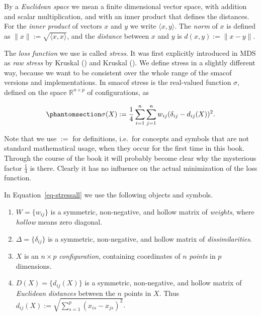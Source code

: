 \documentclass[
  12pt,
  letterpaper,
  DIV=11,
  numbers=noendperiod]{scrreprt}
\providecommand{\tightlist}{%
  \setlength{\itemsep}{0pt}\setlength{\parskip}{0pt}}\usepackage{longtable,booktabs,array}
\theoremstyle{remark}
\begin{document}
By a \emph{Euclidean space} we mean a finite dimensional vector space,
with addition and scalar multiplication, and with an inner product that
defines the distances. For the \emph{inner product} of vectors \(x\) and
\(y\) we write \(\langle x,y\rangle\). The \emph{norm} of \(x\) is
defined as \(\|x\|:=\sqrt{\langle x,x\rangle}\), and the \emph{distance}
between \(x\) and \(y\) is \(d(x,y):=\|x-y\|\).

The \emph{loss function} we use is called \emph{stress}. It was first
explicitly introduced in MDS as \emph{raw stress} by Kruskal
() and Kruskal
(). We define stress in a slightly
different way, because we want to be consistent over the whole range of
the smacof versions and implementations. In smacof stress is the
real-valued function \(\sigma\), defined on the space
\(\mathbb{R}^{n\times p}\) of configurations, as

\begin{equation}\phantomsection\label{eq-stressall}{
\sigma(X):=\frac14\sum_{i=1}^n\sum_{j=1}^n w_{ij}(\delta_{ij}-d_{ij}(X))^2.
}\end{equation}

Note that we use \(:=\) for definitions, i.e.~for concepts and symbols
that are not standard mathematical usage, when they occur for the first
time in this book. Through the course of the book it will probably
become clear why the mysterious factor \(\frac14\) is there. Clearly it
has no influence on the actual minimization of the loss function.

In Equation~\ref{eq-stressall} we use the following objects and symbols.

\begin{enumerate}
\def\labelenumi{\arabic{enumi}.}
\tightlist
\item
  \(W=\{w_{ij}\}\) is a symmetric, non-negative, and hollow matrix of
  \emph{weights}, where \emph{hollow} means zero diagonal.
\item
  \(\Delta=\{\delta_{ij}\}\) is a symmetric, non-negative, and hollow
  matrix of \emph{dissimilarities}.
\item
  \(X\) is an \(n\times p\) \emph{configuration}, containing coordinates
  of \(n\) \emph{points} in \(p\) dimensions.
\item
  \(D(X)=\{d_{ij}(X)\}\) is a symmetric, non-negative, and hollow matrix
  of \emph{Euclidean distances} between the \(n\) points in \(X\). Thus
  \(d_{ij}(X):=\sqrt{\sum_{s=1}^p(x_{is}-x_{js})^2}\).
\end{enumerate}
\end{document}

